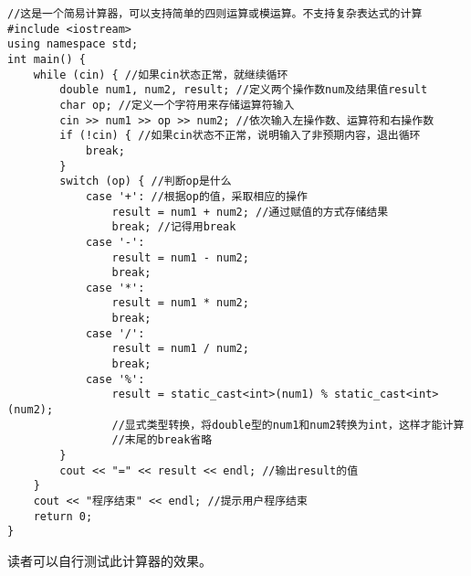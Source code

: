 \begin{lstlisting}[caption=\texttt{简易计算器.cpp},label=lst:SimpleCalculator]
//这是一个简易计算器，可以支持简单的四则运算或模运算。不支持复杂表达式的计算
#include <iostream>
using namespace std;
int main() {
    while (cin) { //如果cin状态正常，就继续循环
        double num1, num2, result; //定义两个操作数num及结果值result
        char op; //定义一个字符用来存储运算符输入
        cin >> num1 >> op >> num2; //依次输入左操作数、运算符和右操作数
        if (!cin) { //如果cin状态不正常，说明输入了非预期内容，退出循环
            break;
        }
        switch (op) { //判断op是什么
            case '+': //根据op的值，采取相应的操作
                result = num1 + num2; //通过赋值的方式存储结果
                break; //记得用break
            case '-':
                result = num1 - num2;
                break;
            case '*':
                result = num1 * num2;
                break;
            case '/':
                result = num1 / num2;
                break;
            case '%':
                result = static_cast<int>(num1) % static_cast<int>(num2);
                //显式类型转换，将double型的num1和num2转换为int，这样才能计算
                //末尾的break省略
        }
        cout << "=" << result << endl; //输出result的值
    }
    cout << "程序结束" << endl; //提示用户程序结束
    return 0;
}
\end{lstlisting}\par
读者可以自行测试此计算器的效果。\par

